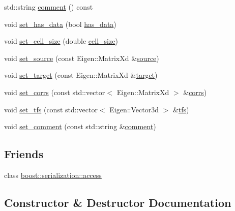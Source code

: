 \begin{DoxyCompactItemize}
\item 
std\+::string \hyperlink{classcommon_1_1MatchInternal_acccb677b9ab80f44f7e66208fc5093ce}{comment} () const
\item 
void \hyperlink{classcommon_1_1MatchInternal_ac8d76d941068e5fc7dd561afa2aa707c}{set\+\_\+has\+\_\+data} (bool \hyperlink{classcommon_1_1MatchInternal_aa45d67544518f4cac0b25a12aee78607}{has\+\_\+data})
\item 
void \hyperlink{classcommon_1_1MatchInternal_ae18d8a6dfae9b7ac243e93d4b4fb3f88}{set\+\_\+cell\+\_\+size} (double \hyperlink{classcommon_1_1MatchInternal_a69a417791950569fed61f59ba3cf79a9}{cell\+\_\+size})
\item 
void \hyperlink{classcommon_1_1MatchInternal_a0012905085722357e80523c50db74148}{set\+\_\+source} (const Eigen\+::\+Matrix\+Xd \&\hyperlink{classcommon_1_1MatchInternal_ab03d9e1343e7363014de8cb08c38ceb8}{source})
\item 
void \hyperlink{classcommon_1_1MatchInternal_ab122317afafbaac0a6ce92c830d846f9}{set\+\_\+target} (const Eigen\+::\+Matrix\+Xd \&\hyperlink{classcommon_1_1MatchInternal_ac84d3e1b4062af44ae7259d2c37f4ef0}{target})
\item 
void \hyperlink{classcommon_1_1MatchInternal_a788efd7d34fd2ece675b5050377d6753}{set\+\_\+corrs} (const std\+::vector$<$ Eigen\+::\+Matrix\+Xd $>$ \&\hyperlink{classcommon_1_1MatchInternal_a4a07e3e47fa6885beee71187c85c0eb0}{corrs})
\item 
void \hyperlink{classcommon_1_1MatchInternal_a6978d626575e6c81028c258fd4706772}{set\+\_\+tfs} (const std\+::vector$<$ Eigen\+::\+Vector3d $>$ \&\hyperlink{classcommon_1_1MatchInternal_a1099ba991441897a0e9879484351cfd0}{tfs})
\item 
void \hyperlink{classcommon_1_1MatchInternal_a546272323b6f29aeb31da0369f4ff5b1}{set\+\_\+comment} (const std\+::string \&\hyperlink{classcommon_1_1MatchInternal_acccb677b9ab80f44f7e66208fc5093ce}{comment})
\end{DoxyCompactItemize}
\subsection*{Friends}
\begin{DoxyCompactItemize}
\item 
class \hyperlink{classcommon_1_1MatchInternal_ac98d07dd8f7b70e16ccb9a01abf56b9c}{boost\+::serialization\+::access}
\end{DoxyCompactItemize}


\subsection{Constructor \& Destructor Documentation}
\mbox{\label{classcommon_1_1MatchInternal_a9f96197acbfb0dd3969e842b5b51dc21}} 
